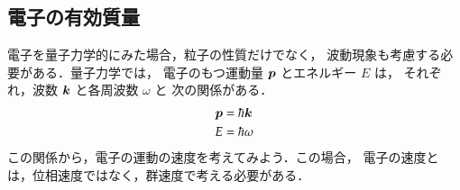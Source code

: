             \subsection{電子の有効質量}
                電子を量子力学的にみた場合，粒子の性質だけでなく，
                波動現象も考慮する必要がある．量子力学では，
                電子のもつ運動量 $\boldsymbol{p}$ とエネルギー $E$ は，
                それぞれ，波数 $\boldsymbol{k}$ と各周波数 $\omega$ と
                次の関係がある．
                    \begin{align}
                        \boldsymbol{p}  &=  \hbar \boldsymbol{k}    \\
                        E     &=  \hbar \omega
                    \end{align}
                この関係から，電子の運動の速度を考えてみよう．この場合，
                電子の速度とは，位相速度ではなく，群速度で考える必要がある．

